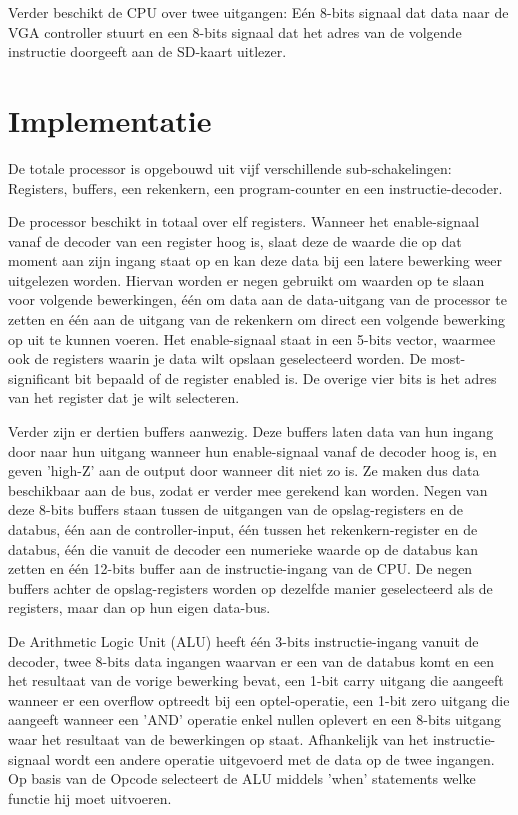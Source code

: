 \documentclass[oneside,dutch]{tudelft-report}
\begin{document}
Verder beschikt de CPU over twee uitgangen: Eén 8-bits signaal dat data naar de VGA controller stuurt en een 8-bits signaal dat het adres van de volgende instructie doorgeeft aan de SD-kaart uitlezer. 

\section{Implementatie}
De totale processor is opgebouwd uit vijf verschillende sub-schakelingen: Registers, buffers, een rekenkern, een program-counter en een instructie-decoder.

De processor beschikt in totaal over elf registers. Wanneer het enable-signaal vanaf de decoder van een register hoog is, slaat deze de waarde die op dat moment aan zijn ingang staat op en kan deze data bij een latere bewerking weer uitgelezen worden. Hiervan worden er negen gebruikt om waarden op te slaan voor volgende bewerkingen, één om data aan de data-uitgang van de processor te zetten en één aan de uitgang van de rekenkern om direct een volgende bewerking op uit te kunnen voeren. Het enable-signaal staat in een 5-bits vector, waarmee ook de registers waarin je data wilt opslaan geselecteerd worden. De most-significant bit bepaald of de register enabled is. De overige vier bits is het adres van het register dat je wilt selecteren.

Verder zijn er dertien buffers aanwezig. Deze buffers laten data van hun ingang door naar hun uitgang wanneer hun enable-signaal vanaf de decoder hoog is, en geven 'high-Z' aan de output door wanneer dit niet zo is. Ze maken dus data beschikbaar aan de bus, zodat er verder mee gerekend kan worden. Negen van deze 8-bits buffers staan tussen de uitgangen van de opslag-registers en de databus, één aan de controller-input, één tussen het rekenkern-register en de databus, één die vanuit de decoder een numerieke waarde op de databus kan zetten en één 12-bits buffer aan de instructie-ingang van de CPU. De negen buffers achter de opslag-registers worden op dezelfde manier geselecteerd als de registers, maar dan op hun eigen data-bus.

De Arithmetic Logic Unit (ALU) heeft één 3-bits instructie-ingang vanuit de decoder, twee 8-bits data ingangen waarvan er een van de databus komt en een het resultaat van de vorige bewerking bevat, een 1-bit carry uitgang die aangeeft wanneer er een overflow optreedt bij een optel-operatie, een 1-bit zero uitgang die aangeeft wanneer een 'AND' operatie enkel nullen oplevert en een 8-bits uitgang waar het resultaat van de bewerkingen op staat. Afhankelijk van het instructie-signaal wordt een andere operatie uitgevoerd met de data op de twee ingangen.
Op basis van de Opcode selecteert de ALU middels 'when' statements welke functie hij moet uitvoeren.
\end{document}
